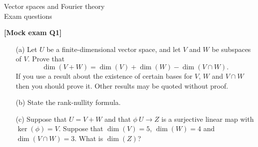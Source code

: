 \documentclass[a4paper]{article}
\begin{document}
\begin{center}
 {\Huge Vector spaces and Fourier theory \\ Exam questions}
\end{center}
\vspace{4ex}

\begin{problem}\textbf{[Mock exam Q1]}
 \begin{itemize}
  \item[(a)] Let $U$ be a finite-dimensional vector space,
   and let $V$ and $W$ be subspaces of $V$.  Prove that
   \[ \dim(V+W) = \dim(V) + \dim(W) - \dim(V\cap W). \]
   If you use a result about the existence of certain bases
   for $V$, $W$ and $V\cap W$ then you should prove it.
   Other results may be quoted without proof.  
  \item[(b)] State the rank-nullity formula. 
  \item[(c)] Suppose that $U=V+W$ and that $\phi\:U\to Z$ 
   is a surjective linear map with $\ker(\phi)=V$.  Suppose
   that $\dim(V)=5$, $\dim(W)=4$ and $\dim(V\cap W)=3$. 
   What is $\dim(Z)$? 
 \end{itemize}
\end{problem}
\end{document}

